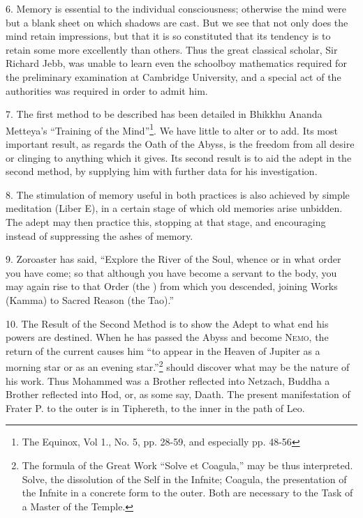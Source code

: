 6. Memory is essential to the individual consciousness; otherwise the mind were but a blank sheet on which shadows are cast. But we see that not only does the mind retain impressions, but that it is so constituted that its tendency is to retain some more excellently than others. Thus the great classical scholar, Sir Richard Jebb, was unable to learn even the schoolboy mathematics required for the preliminary examination at Cambridge University, and a special act of the authorities was required in order to admit him.

7. The first method to be described has been detailed in Bhikkhu Ananda Metteya's \enquote{Training of the Mind}\footnote{The Equinox, Vol 1., No. 5, pp. 28-59, and especially pp. 48-56}. We have little to alter or to add. Its most important result, as regards the Oath of the Abyss, is the freedom from all desire or clinging to anything which it gives. Its second result is to aid the adept in the second method, by supplying him with further data for his investigation.

8. The stimulation of memory useful in both practices is also achieved by simple meditation (Liber E), in a certain stage of which old memories arise unbidden. The adept may then practice this, stopping at that stage, and encouraging instead of suppressing the ashes of memory.

9. Zoroaster has said, \enquote{Explore the River of the Soul, whence or in what order you have come; so that although you have become a servant to the body, you may again rise to that Order (the \Argentium{}{}) from which you descended, joining Works (Kamma) to Sacred Reason (the Tao).}

10. The Result of the Second Method is to show the Adept to what end his powers are destined. When he has passed the Abyss and become \textsc{Nemo}, the return of the current causes him \enquote{to appear in the Heaven of Jupiter as a morning star or as an evening star.}\footnote{The formula of the Great Work \enquote{Solve et Coagula,} may be thus interpreted. Solve, the dissolution of the Self in the Infnite; Coagula, the presentation of the Infnite in a concrete form to the outer. Both are necessary to the Task of a Master of the Temple.} should discover what may be the nature of his work. Thus Mohammed was a Brother reflected into Netzach, Buddha a Brother reflected into Hod, or, as some say, Daath. The present manifestation of Frater P. to the outer is in Tiphereth, to the inner in the path of Leo.

